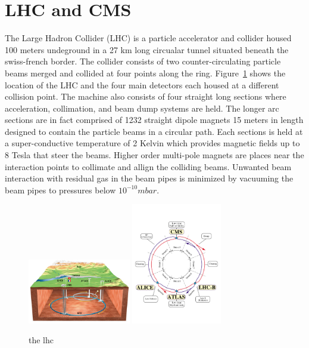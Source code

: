 \clearpage
\section{LHC and CMS\label{sec:detector}}

The Large Hadron Collider (LHC) is a particle accelerator and collider
housed 100 meters undeground in a 27 km long circualar tunnel situated 
beneath the swiss-french border. The collider consists of two 
counter-circulating particle beams merged and collided at four points 
along the ring. Figure~\ref{fig:lhc} shows the location of the LHC and 
the four main detectors each housed at a different collision point.
The machine also consists of four straight long sections where acceleration, 
collimation, and beam dump systems are held. The longer arc sections are
in fact comprised of 1232 straight dipole magnets 15 meters in length designed to contain 
the particle beams in a circular path. Each sections is held at a 
super-conductive temperature of 2 Kelvin which provides magnetic fields up to 8
Tesla that steer the beams. Higher order multi-pole magnets are 
places near the interaction points to collimate and allign the 
colliding beams. Unwanted beam interaction with residual gas in the beam pipes
is minimized by vacuuming the beam pipes to pressures below $10^{-10}mbar$.

\begin{figure}[h!t]
  \begin{center}
      \includegraphics[width=0.40\textwidth,]{figures/CERNMap.jpg}
      \includegraphics[width=0.35\textwidth,]{figures/lhc-pho-1997-060.jpg}
      \caption{\label{fig:lhc} the lhc}
  \end{center}
\end{figure}

